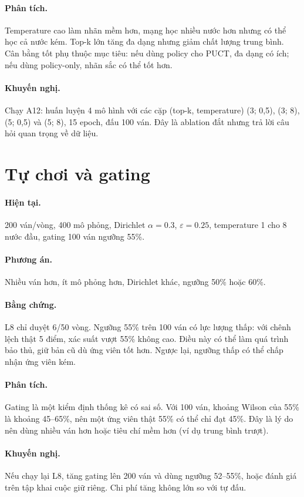 \paragraph{Phân tích.} Temperature cao làm nhãn mềm hơn, mạng học nhiều nước hơn nhưng có thể
học cả nước kém. Top-k lớn tăng đa dạng nhưng giảm chất lượng trung bình. Cân bằng tốt phụ
thuộc mục tiêu: nếu dùng policy cho PUCT, đa dạng có ích; nếu dùng policy-only, nhãn sắc có
thể tốt hơn.
\paragraph{Khuyến nghị.} Chạy A12: huấn luyện 4 mô hình với các cặp (top-k, temperature)
(3; 0,5), (3; 8), (5; 0,5) và (5; 8), 15 epoch, đấu 100 ván. Đây là ablation đắt nhưng trả lời
câu hỏi quan trọng về dữ liệu.

\section{Tự chơi và gating}
\paragraph{Hiện tại.} 200 ván/vòng, 400 mô phỏng, Dirichlet $\alpha=0.3$, $\varepsilon=0.25$,
temperature 1 cho 8 nước đầu, gating 100 ván ngưỡng 55\%.
\paragraph{Phương án.} Nhiều ván hơn, ít mô phỏng hơn, Dirichlet khác, ngưỡng 50\% hoặc 60\%.
\paragraph{Bằng chứng.} L8 chỉ duyệt 6/50 vòng. Ngưỡng 55\% trên 100 ván có lực lượng thấp:
với chênh lệch thật 5 điểm, xác suất vượt 55\% không cao. Điều này có thể làm quá trình bảo
thủ, giữ bản cũ dù ứng viên tốt hơn. Ngược lại, ngưỡng thấp có thể chấp nhận ứng viên kém.
\paragraph{Phân tích.} Gating là một kiểm định thống kê có sai số. Với 100 ván, khoảng Wilson
của 55\% là khoảng 45--65\%, nên một ứng viên thật 55\% có thể chỉ đạt 45\%. Đây là lý do nên
dùng nhiều ván hơn hoặc tiêu chí mềm hơn (ví dụ trung bình trượt).
\paragraph{Khuyến nghị.} Nếu chạy lại L8, tăng gating lên 200 ván và dùng ngưỡng 52--55\%, hoặc
đánh giá trên tập khai cuộc giữ riêng. Chi phí tăng không lớn so với tự đấu.

